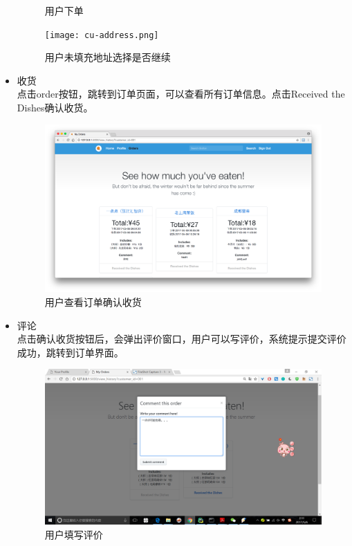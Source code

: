 \documentclass[12pt, oneside,a4paper]{article}
\begin{document}
\begin{itemize}
\begin{figure}[H]
     \caption{\small{用户下单}}
  \end{figure}
  \begin{figure}[H]
   \centering
     \texttt{[image: cu-address.png]}
     \caption{\small{用户未填充地址选择是否继续}}
  \end{figure}
  \item 收货\\
  点击order按钮，跳转到订单页面，可以查看所有订单信息。点击Received the Dishes确认收货。
  \begin{figure}[H]
   \centering
     \includegraphics[width=6.00in]{cu-order.jpg}
     \caption{\small{用户查看订单确认收货}}
  \end{figure}
  \item 评论\\
  点击确认收货按钮后，会弹出评价窗口，用户可以写评价，系统提示提交评价成功，跳转到订单界面。
  \begin{figure}[H]
   \centering
     \includegraphics[width=6.00in]{cu-comment.jpg}
     \caption{\small{用户填写评价}}
  \end{figure}
  \end{itemize}
  
\end{document}
